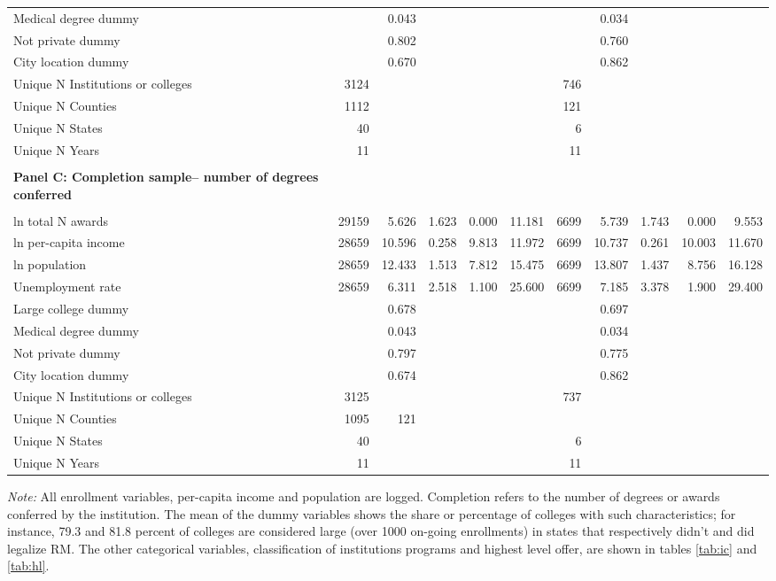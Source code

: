 \documentclass[12pt]{article}%
\begin{document}
\begin{table}
{\begin{tabular}[t]{lrrrrrrrrrr}
Medical degree dummy & & \num{0.043} &&&&&\num{0.034}\\
Not private dummy & & \num{0.802} &&&&& \num{0.760}\\
City location dummy & & \num{0.670} &&&&& \num{0.862}\\
Unique N Institutions or colleges & 3124  &&&&&  746\\
Unique N Counties & 1112 &&&&& 121\\
Unique N States & 40 &&&&& 6\\
Unique N Years & 11 &&&&& 11\\
\midrule \\[-1.8ex]
\textbf{Panel C: Completion sample-- number of degrees conferred}\\  \\[-1.8ex] 
ln total N awards & 29159 & \num{5.626} & \num{1.623} & \num{0.000} & \num{11.181} & 6699 & \num{5.739} & \num{1.743} & \num{0.000} & \num{9.553}\\
ln per-capita income & 28659 & \num{10.596} & \num{0.258} & \num{9.813} & \num{11.972} & 6699 & \num{10.737} & \num{0.261} & \num{10.003} & \num{11.670}\\
ln population & 28659 & \num{12.433} & \num{1.513} & \num{7.812} & \num{15.475} & 6699 & \num{13.807} & \num{1.437} & \num{8.756} & \num{16.128}\\
Unemployment rate & 28659 & \num{6.311} & \num{2.518} & \num{1.100} & \num{25.600} & 6699 & \num{7.185} & \num{3.378} & \num{1.900} & \num{29.400}\\
Large college dummy && \num{0.678} &&&&& \num{0.697}\\
Medical degree dummy && \num{0.043} &&&&& \num{0.034}\\
Not private dummy && \num{0.797} &&&&& \num{0.775}\\
City location dummy && \num{0.674} &&&&& \num{0.862}\\
Unique N Institutions or colleges & 3125  &&&&&   737\\
Unique N Counties & 1095 & 121\\
Unique N States & 40 &&&&& 6\\
Unique N Years & 11 &&&&& 11\\
\bottomrule
\end{tabular}}
\end{table}
\FloatBarrier

\textit{Note:} All enrollment variables, per-capita income and population are logged. Completion refers to the number of degrees or awards conferred by the institution. The mean of the dummy variables shows the share or percentage of colleges with such characteristics; for instance, 79.3 and 81.8 percent of colleges are considered large (over 1000 on-going enrollments) in states that respectively didn't and did legalize RM. The other categorical variables, classification of institutions programs and highest level offer, are shown in tables \ref{tab:ic} and \ref{tab:hl}.
\end{document}
